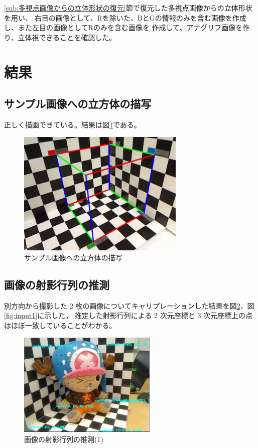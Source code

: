 \documentclass[11pt,a4j]{jsarticle}
\makeatletter
\newcommand{\figcaption}[1]{\def\@captype{figure}\caption{#1}}
\makeatother
\begin{document}
\ref{sub:多視点画像からの立体形状の復元}節で復元した多視点画像からの立体形状を用い、
右目の画像として、Rを除いた、BとGの情報のみを含む画像を作成し、また左目の画像としてRのみを含む画像を
作成して、アナグリフ画像を作り、立体視できることを確認した。

\section{結果}
\label{sec:結果}

\subsection{サンプル画像への立方体の描写}
\label{sub:result_box}

正しく描画できている。結果は図\ref{fig:サンプル画像への立方体の描写の写真}である。

\begin{figure}[H]
  \centering
  \includegraphics[height=60mm,bb=0 0 640 480]{image/task0.jpg}
  \figcaption{サンプル画像への立方体の描写}
  \label{fig:サンプル画像への立方体の描写の写真}
\end{figure}


\subsection{画像の射影行列の推測}
\label{sub:result_syaei}

別方向から撮影した 2 枚の画像についてキャリプレーションした結果を図\ref{fig:input0}、図\ref{fig:input1}に示した。
推定した射影行列による 2 次元座標と 3 次元座標上の点はほぼ一致していることがわかる。

\begin{figure}[H]
  \centering
  \includegraphics[height=50mm,bb=0 0 642 486]{image/input0.png}
  \figcaption{画像の射影行列の推測(1)}
  \label{fig:input0}
\end{figure}
\end{document}
